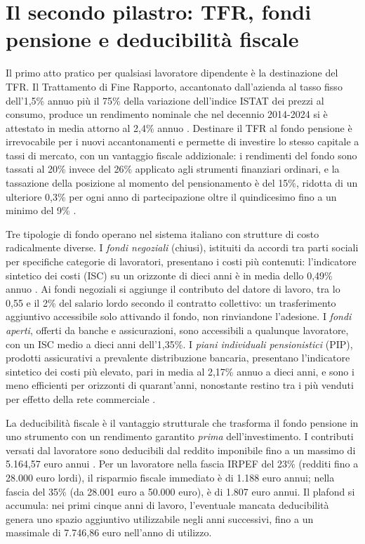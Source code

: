 \section{Il secondo pilastro: TFR, fondi pensione e deducibilità fiscale}
\label{sec:secondo_pilastro}

\noindent
Il primo atto pratico per qualsiasi lavoratore dipendente è la
destinazione del TFR. Il Trattamento di Fine Rapporto, accantonato
dall'azienda al tasso fisso dell'1,5\% annuo più il 75\% della
variazione dell'indice ISTAT dei prezzi al consumo, produce un
rendimento nominale che nel decennio 2014-2024 si è attestato in media
attorno al 2,4\% annuo \cite{COVIP2024}. Destinare il TFR al
fondo pensione è irrevocabile per i nuovi accantonamenti e permette
di investire lo stesso capitale a tassi di mercato, con un vantaggio
fiscale addizionale: i rendimenti del fondo sono tassati al 20\%
invece del 26\% applicato agli strumenti finanziari ordinari, e
la tassazione della posizione al momento del pensionamento è del
15\%, ridotta di un ulteriore 0,3\% per ogni anno di partecipazione
oltre il quindicesimo fino a un minimo del 9\% \cite{BosiGuerra2022}.

\medskip
\noindent
Tre tipologie di fondo operano nel sistema italiano con strutture
di costo radicalmente diverse. I \emph{fondi negoziali} (chiusi),
istituiti da accordi tra parti sociali per specifiche categorie di
lavoratori, presentano i costi più contenuti: l'indicatore sintetico
dei costi (ISC) su un orizzonte di dieci anni è in media dello
0,49\% annuo \cite{COVIP2024}. Ai fondi negoziali si aggiunge il
contributo del datore di lavoro, tra lo 0,55 e il 2\% del salario
lordo secondo il contratto collettivo: un trasferimento aggiuntivo
accessibile solo attivando il fondo, non rinviandone l'adesione. I
\emph{fondi aperti}, offerti da banche e assicurazioni, sono
accessibili a qualunque lavoratore, con un ISC medio a dieci anni
dell'1,35\%. I \emph{piani individuali pensionistici} (PIP), prodotti
assicurativi a prevalente distribuzione bancaria, presentano
l'indicatore sintetico dei costi più elevato, pari in media al
2,17\% annuo a dieci anni, e sono i meno efficienti per orizzonti di
quarant'anni, nonostante restino tra i più venduti per effetto della
rete commerciale \cite{COVIP2024}.

\medskip
\noindent
La deducibilità fiscale è il vantaggio strutturale che trasforma
il fondo pensione in uno strumento con un rendimento garantito
\emph{prima} dell'investimento. I contributi versati dal lavoratore
sono deducibili dal reddito imponibile fino a un massimo di
5.164,57 euro annui \cite{BosiGuerra2022}. Per un lavoratore
nella fascia IRPEF del 23\% (redditi fino a 28.000 euro lordi),
il risparmio fiscale immediato è di 1.188 euro annui; nella fascia
del 35\% (da 28.001 euro a 50.000 euro), è di 1.807 euro
annui. Il plafond si accumula: nei primi cinque anni di lavoro,
l'eventuale mancata deducibilità genera uno spazio aggiuntivo
utilizzabile negli anni successivi, fino a un massimale di
7.746,86 euro nell'anno di utilizzo.

